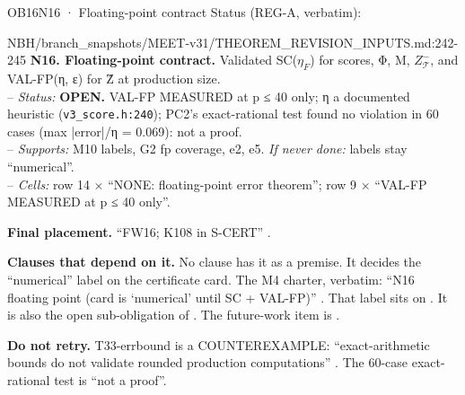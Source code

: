 \begin{card}{OB16}{N16 · Floating-point contract}
Status (REG-A, verbatim):  
\begin{stmt}{NBH/branch_snapshots/MEET-v31/THEOREM_REVISION_INPUTS.md:242-245}
\textbf{N16. Floating-point contract.} Validated SC($η_F$) for scores, Φ, M, $Z_{𝒯}^{−}$, and VAL-FP(η, ε) for Ẑ at production size.\\
– \emph{Status:} \textbf{OPEN.} VAL-FP MEASURED at p ≤ 40 only; η a documented heuristic (\texttt{v3\_score.h:240}); PC2's exact-rational test found no violation in 60 cases (max |error|/η = 0.069): not a proof.\\
– \emph{Supports:} M10 labels, G2 fp coverage, e2, e5. \emph{If never done:} labels stay ``numerical''.\\
– \emph{Cells:} row 14 × ``NONE: floating-point error theorem''; row 9 × ``VAL-FP MEASURED at p ≤ 40 only''.
\end{stmt}
\textbf{Final placement.} ``FW16; K108 in S-CERT'' .

\textbf{Clauses that depend on it.} No clause has it as a premise. It decides the ``numerical'' label on the certificate card. The M4 charter, verbatim: ``N16 floating point (card is `numerical' until SC + VAL-FP)'' . That label sits on . It is also the open sub-obligation of . The future-work item is .

\textbf{Do not retry.} T33-errbound is a COUNTEREXAMPLE: ``exact-arithmetic bounds do not validate rounded production computations'' . The 60-case exact-rational test is ``not a proof''.
\end{card}

